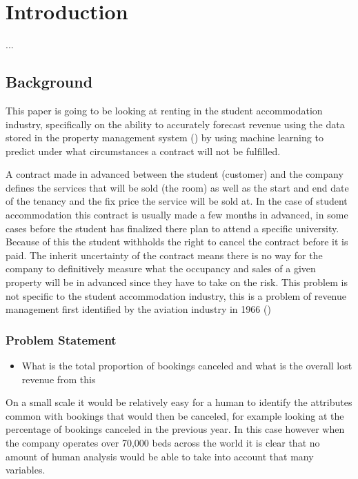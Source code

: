 \chapter{Introduction}

...
\section{Background}
This paper is going to be looking at renting in the student accommodation industry, specifically on the ability to accurately forecast revenue using the data stored in the property management system (\cite{Jain2006IntellectualPerspective}) by using machine learning to predict under what circumstances a contract will not be fulfilled.

\vspace{5mm}

A contract made in advanced between the student (customer) and the company defines the services that will be sold (the room) as well as the start and end date of the tenancy and the fix price the service will be sold at. In the case of student accommodation this contract is usually made a few months in advanced, in some cases before the student has finalized there plan to attend a specific university. Because of this the student withholds the right to cancel the contract before it is paid. The inherit uncertainty of the contract means there is no way for the company to definitively measure what the occupancy and sales of a given property will be in advanced since they have to take on the risk. This problem is not specific to the student accommodation industry, this is a problem of revenue management first identified by the aviation industry in 1966  (\cite{Chiang2007AnResearch})


\subsection{Problem Statement}

\begin{itemize}
\item What is the total proportion of bookings canceled and what is the overall lost revenue from this
\end{itemize}


On a small scale it would be relatively easy for a human to identify the attributes common with bookings that would then be canceled, for example looking at the percentage of bookings canceled in the previous year. In this case however when the company operates over 70,000 beds across the world it is clear that no amount of human analysis would be able to take into account that many variables. 

